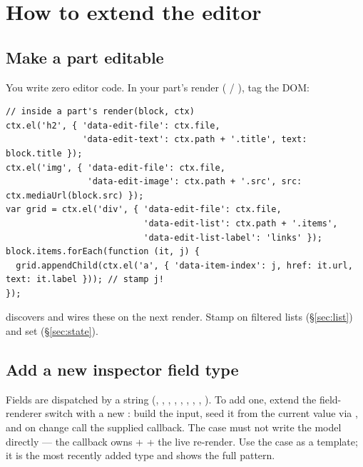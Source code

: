 \documentclass[11pt]{article}
\begin{document}
\section{How to extend the editor}\label{sec:extend}

\subsection{Make a part editable}

You write zero editor code. In your part's render ( /
), tag the DOM:

\begin{lstlisting}
// inside a part's render(block, ctx)
ctx.el('h2', { 'data-edit-file': ctx.file,
               'data-edit-text': ctx.path + '.title', text: block.title });
ctx.el('img', { 'data-edit-file': ctx.file,
                'data-edit-image': ctx.path + '.src', src: ctx.mediaUrl(block.src) });
var grid = ctx.el('div', { 'data-edit-file': ctx.file,
                           'data-edit-list': ctx.path + '.items',
                           'data-edit-list-label': 'links' });
block.items.forEach(function (it, j) {
  grid.appendChild(ctx.el('a', { 'data-item-index': j, href: it.url, text: it.label })); // stamp j!
});
\end{lstlisting}

 discovers and wires these on the next render. Stamp
 on filtered lists (\S\ref{sec:list}) and set
 (\S\ref{sec:state}).

\subsection{Add a new inspector field type}

Fields are dispatched by a  string
(, , , , ,
, , , ). To add one, extend the
field-renderer switch with a new : build the input, seed it from the
current value via , and on change call the supplied
 callback. The case must not write the model directly --- the
callback owns  +  + the live re-render. Use the
 case as a template; it is the most recently added type and shows the
full pattern.
\end{document}
